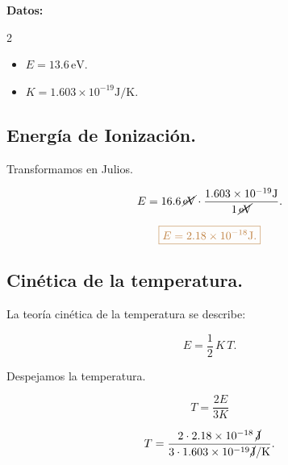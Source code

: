 \documentclass[a4paper,12pt]{article} %
\begin{document}
\begin{justify}
    \textbf{Datos:}
\end{justify}

\begin{multicols}{2}
    \begin{itemize}
        \item \( E = 13.6 \, \mathrm{eV}. \)
        \item \( K = 1.603 \times 10^{-19} \mathrm{J}/\mathrm{K}. \)
    \end{itemize}
\end{multicols}

\subsection{Energía de Ionización.}

\begin{justify}
    Transformamos en Julios.
\end{justify}

\[ E = 16.6 \, \cancel{\mathrm{eV}} \cdot \frac{1.603 \times 10^{-19} \mathrm{J}}{ 1 \, \cancel{\mathrm{eV}}}. \]

\vspace{\baselineskip}

\[ \textcolor{brown}{ \boxed{ E = 2.18 \times 10^{-18} \mathrm{J}. } } \]

\vspace{\baselineskip}

\subsection{Cinética de la temperatura.}

\begin{justify}
    La teoría cinética de la temperatura se describe:
\end{justify}

\[ E = \frac{1}{2} \, K \, T. \]

\begin{justify}
    Despejamos la temperatura.
\end{justify}

\[ T = \frac{2E}{3K} \]

\vspace{\baselineskip}

\[ T = \frac{2 \cdot  2.18 \times 10^{-18} \, \cancel{ \mathrm{J}} }{3 \cdot 1.603 \times 10^{-19} \cancel{\mathrm{J}} / \mathrm{K}}. \]

\vspace{\baselineskip}
\end{document}
